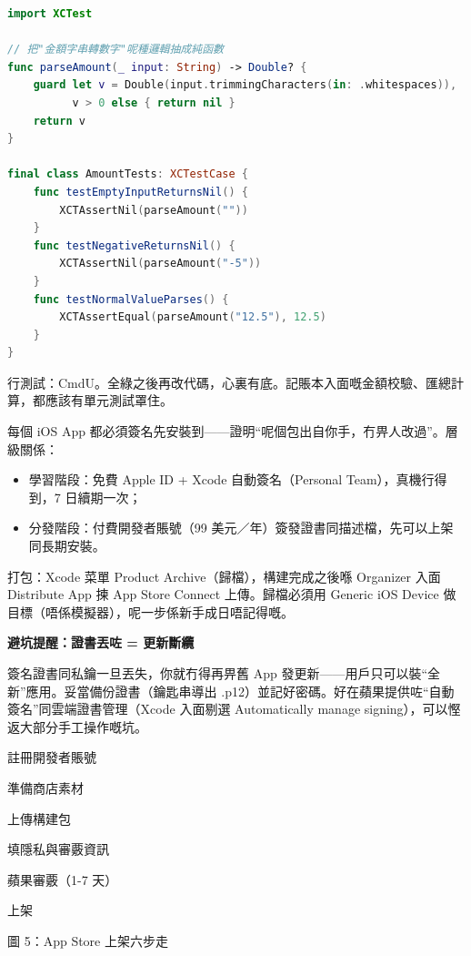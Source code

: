 \begin{lstlisting}[language=Swift]
import XCTest

// 把"金額字串轉數字"呢種邏輯抽成純函數
func parseAmount(_ input: String) -> Double? {
    guard let v = Double(input.trimmingCharacters(in: .whitespaces)),
          v > 0 else { return nil }
    return v
}

final class AmountTests: XCTestCase {
    func testEmptyInputReturnsNil() {
        XCTAssertNil(parseAmount(""))
    }
    func testNegativeReturnsNil() {
        XCTAssertNil(parseAmount("-5"))
    }
    func testNormalValueParses() {
        XCTAssertEqual(parseAmount("12.5"), 12.5)
    }
}
\end{lstlisting}

行測試：CmdU。全綠之後再改代碼，心裏有底。記賬本入面嘅金額校驗、匯總計算，都應該有單元測試罩住。


每個 iOS App 都必須簽名先安裝到——證明“呢個包出自你手，冇畀人改過”。層級關係：

\begin{itemize}
  \item 學習階段：免費 Apple ID + Xcode 自動簽名（Personal Team），真機行得到，7 日續期一次；
  \item 分發階段：付費開發者賬號（99 美元／年）簽發證書同描述檔，先可以上架同長期安裝。
\end{itemize}

打包：Xcode 菜單 Product Archive（歸檔），構建完成之後喺 Organizer 入面 Distribute App 揀 App Store Connect 上傳。歸檔必須用 Generic iOS Device 做目標（唔係模擬器），呢一步係新手成日唔記得嘅。

\textbf{避坑提醒：證書丟咗 = 更新斷纜}\par

簽名證書同私鑰一旦丟失，你就冇得再畀舊 App 發更新——用戶只可以裝“全新”應用。妥當備份證書（鑰匙串導出 .p12）並記好密碼。好在蘋果提供咗“自動簽名”同雲端證書管理（Xcode 入面剔選 Automatically manage signing），可以慳返大部分手工操作嘅坑。


註冊開發者賬號

準備商店素材

上傳構建包

填隱私與審覈資訊

蘋果審覈（1-7 天）

上架

\begin{center}\small\color{gray}圖 5：App Store 上架六步走\end{center}

